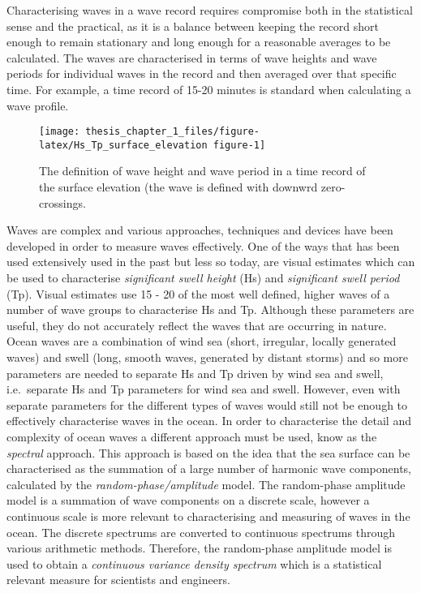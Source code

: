 \documentclass[
]{article}
\begin{document}
Characterising waves in a wave record requires compromise both in the
statistical sense and the practical, as it is a balance between keeping
the record short enough to remain stationary and long enough for a
reasonable averages to be calculated. The waves are characterised in
terms of wave heights and wave periods for individual waves in the
record and then averaged over that specific time. For example, a time
record of 15-20 minutes is standard when calculating a wave profile.

\begin{figure}

{\centering \texttt{[image: thesis\_chapter\_1\_files/figure-latex/Hs\_Tp\_surface\_elevation figure-1]} 

}

\caption{The definition of wave height and wave period in a time record of the surface elevation (the wave is defined with downwrd zero-crossings.}\label{fig:Hs_Tp_surface_elevation figure}
\end{figure}

Waves are complex and various approaches, techniques and devices have
been developed in order to measure waves effectively. One of the ways
that has been used extensively used in the past but less so today, are
visual estimates which can be used to characterise \emph{significant
swell height} (Hs) and \emph{significant swell period} (Tp). Visual
estimates use 15 - 20 of the most well defined, higher waves of a number
of wave groups to characterise Hs and Tp. Although these parameters are
useful, they do not accurately reflect the waves that are occurring in
nature. Ocean waves are a combination of wind sea (short, irregular,
locally generated waves) and swell (long, smooth waves, generated by
distant storms) and so more parameters are needed to separate Hs and Tp
driven by wind sea and swell, i.e.~separate Hs and Tp parameters for
wind sea and swell. However, even with separate parameters for the
different types of waves would still not be enough to effectively
characterise waves in the ocean. In order to characterise the detail and
complexity of ocean waves a different approach must be used, know as the
\emph{spectral} approach. This approach is based on the idea that the
sea surface can be characterised as the summation of a large number of
harmonic wave components, calculated by the
\emph{random-phase/amplitude} model. The random-phase amplitude model is
a summation of wave components on a discrete scale, however a continuous
scale is more relevant to characterising and measuring of waves in the
ocean. The discrete spectrums are converted to continuous spectrums
through various arithmetic methods. Therefore, the random-phase
amplitude model is used to obtain a \emph{continuous variance density
spectrum} which is a statistical relevant measure for scientists and
engineers.
\end{document}
